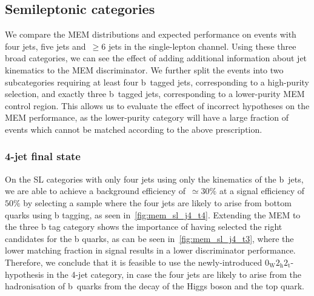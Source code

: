 \subsection{Semileptonic categories}
We compare the MEM distributions and expected performance on events with four jets, five jets and~$\ge6$ jets in the single-lepton channel. Using these three broad categories, we can see the effect of adding additional information about jet kinematics to the MEM discriminator. We further split the events into two subcategories requiring at least four b~tagged jets, corresponding to a high-purity selection, and exactly three b~tagged jets, corresponding to a lower-purity MEM control region. This allows us to evaluate the effect of incorrect hypotheses on the MEM performance, as the lower-purity category will have a large fraction of events which cannot be matched according to the above prescription. 

\subsubsection{4-jet final state}
On the SL categories with only four jets using only the kinematics of the b~jets, we are able to achieve a background efficiency of~$\simeq 30\%$ at a signal efficiency of~$50\%$ by selecting a sample where the four jets are likely to arise from bottom quarks using b tagging, as seen in~\cref{fig:mem_sl_j4_t4}. Extending the MEM to the three b tag category shows the importance of having selected the right candidates for the b quarks, as can be seen in~\cref{fig:mem_sl_j4_t3}, where the lower matching fraction in signal results in a lower discriminator performance. Therefore, we conclude that it is feasible to use the newly-introduced $0_{\mathrm{W}} 2_{\mathrm{h}} 2_{\mathrm{t}}$-hypothesis in the 4-jet category, in case the four jets are likely to arise from the hadronisation of b~quarks from the decay of the Higgs boson and the top quark.

